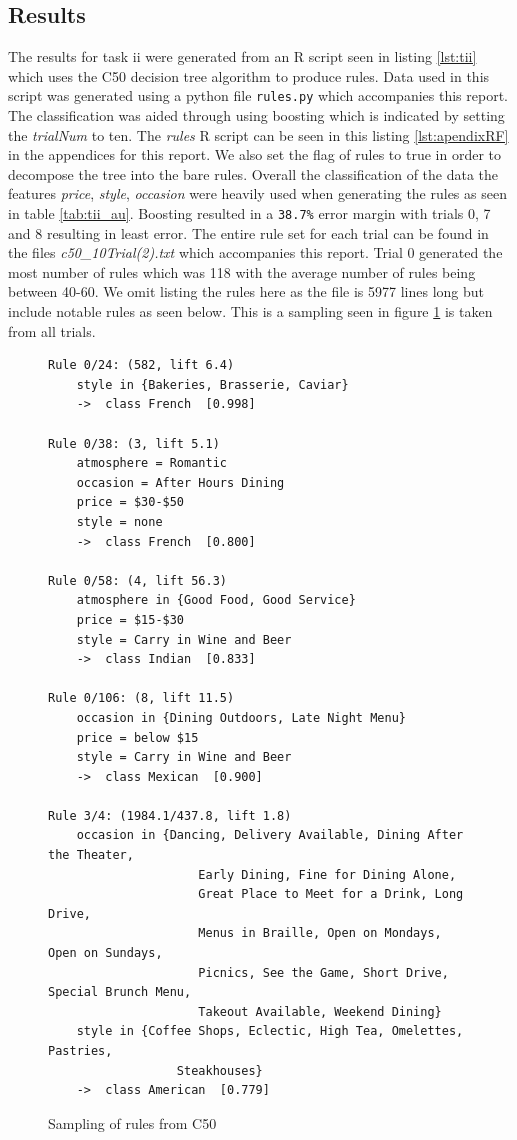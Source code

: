 \documentclass[letterpaper,10pt]{article}
\begin{document}
\subsection*{Results}
The results for task ii were generated from an R script seen in listing \hyperref[lst:tii]{\ref{lst:tii}} which uses the C50 decision tree algorithm to produce rules. Data used in this script was generated using a python file \verb+rules.py+ which accompanies this report. The classification was aided through using boosting which is indicated by setting the \textit{trialNum} to ten. The \textit{rules} R script can be seen in this listing \hyperref[lst:apendixRF]{\ref{lst:apendixRF}} in the appendices for this report. We also set the flag of rules to true in order to decompose the tree into the bare rules. \newline\newline
Overall the classification of the data the features \textit{price}, \textit{style}, \textit{occasion} were heavily used when generating the rules as seen in table \hyperref[tab:tii_au]{\ref{tab:tii_au}}. Boosting resulted in a \verb+38.7%+ error margin with trials 0, 7 and 8 resulting in least error. The entire rule set for each trial can be found in the files \textit{c50\_10Trial(2).txt} which accompanies this report.
Trial 0 generated the most number of rules which was 118 with the average number of rules being between 40-60. We omit listing the rules here as the file is 5977 lines long but include notable rules as seen below. This is a sampling seen in figure \hyperref[fig:c50]{\ref{fig:c50}} is taken from all trials.
\begin{figure}[h]
\begin{verbatim}
Rule 0/24: (582, lift 6.4)
	style in {Bakeries, Brasserie, Caviar}
	->  class French  [0.998]

Rule 0/38: (3, lift 5.1)
	atmosphere = Romantic
	occasion = After Hours Dining
	price = $30-$50
	style = none
	->  class French  [0.800]
	
Rule 0/58: (4, lift 56.3)
	atmosphere in {Good Food, Good Service}
	price = $15-$30
	style = Carry in Wine and Beer
	->  class Indian  [0.833]

Rule 0/106: (8, lift 11.5)
	occasion in {Dining Outdoors, Late Night Menu}
	price = below $15
	style = Carry in Wine and Beer
	->  class Mexican  [0.900]
	
Rule 3/4: (1984.1/437.8, lift 1.8)
	occasion in {Dancing, Delivery Available, Dining After the Theater,
                     Early Dining, Fine for Dining Alone,
                     Great Place to Meet for a Drink, Long Drive,
                     Menus in Braille, Open on Mondays, Open on Sundays,
                     Picnics, See the Game, Short Drive, Special Brunch Menu,
                     Takeout Available, Weekend Dining}
	style in {Coffee Shops, Eclectic, High Tea, Omelettes, Pastries,
                  Steakhouses}
	->  class American  [0.779]
\end{verbatim}
\caption{Sampling of rules from C50}
\label{fig:c50} 
\end{figure}
\end{document}
